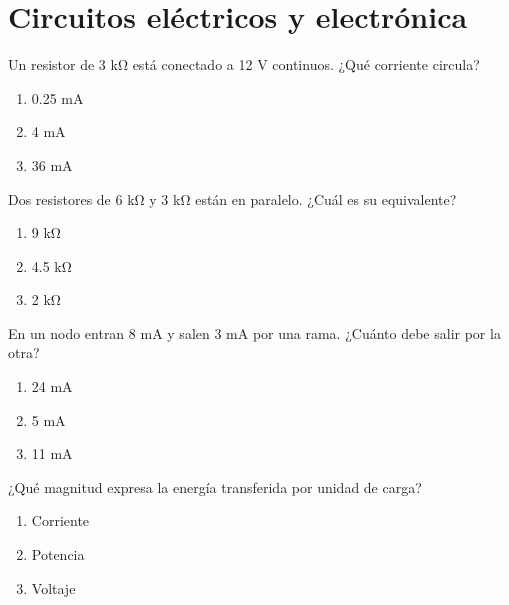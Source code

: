 \section{Circuitos eléctricos y electrónica}

\noindent\begin{minipage}{\linewidth}\setlength{\parskip}{4pt}\label{q:H-001}
Un resistor de 3 kΩ está conectado a 12 V continuos. ¿Qué corriente circula?
\begin{enumerate}[label=\Alph*),nosep]
\item 0.25 mA
\item 4 mA
\item 36 mA
\end{enumerate}\end{minipage}\par\medskip

\noindent\begin{minipage}{\linewidth}\setlength{\parskip}{4pt}\label{q:H-002}
Dos resistores de 6 kΩ y 3 kΩ están en paralelo. ¿Cuál es su equivalente?
\begin{enumerate}[label=\Alph*),nosep]
\item 9 kΩ
\item 4.5 kΩ
\item 2 kΩ
\end{enumerate}\end{minipage}\par\medskip

\noindent\begin{minipage}{\linewidth}\setlength{\parskip}{4pt}\label{q:H-003}
En un nodo entran 8 mA y salen 3 mA por una rama. ¿Cuánto debe salir por la otra?
\begin{enumerate}[label=\Alph*),nosep]
\item 24 mA
\item 5 mA
\item 11 mA
\end{enumerate}\end{minipage}\par\medskip

\noindent\begin{minipage}{\linewidth}\setlength{\parskip}{4pt}\label{q:H-004}
¿Qué magnitud expresa la energía transferida por unidad de carga?
\begin{enumerate}[label=\Alph*),nosep]
\item Corriente
\item Potencia
\item Voltaje
\end{enumerate}\end{minipage}\par\medskip

